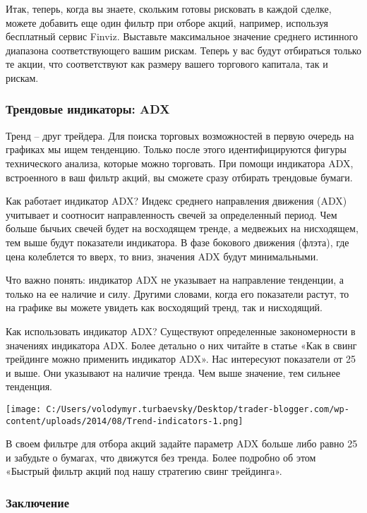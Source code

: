 \documentclass[a5paper]{article}
\begin{document}
Итак, теперь, когда вы знаете, скольким готовы рисковать в каждой
сделке, можете добавить еще один фильтр при отборе акций, например,
используя бесплатный сервис Finviz. Выставьте максимальное значение
среднего истинного диапазона соответствующего вашим рискам. Теперь у
вас будут отбираться только те акции, что соответствуют как размеру
вашего торгового капитала, так и рискам.

\subsubsection{Трендовые индикаторы: ADX}

Тренд – друг трейдера. Для поиска торговых возможностей в первую очередь на графиках мы ищем тенденцию. Только после этого идентифицируются фигуры технического анализа, которые можно торговать. При помощи индикатора ADX, встроенного в ваш фильтр акций, вы сможете сразу отбирать  трендовые бумаги.

Как работает индикатор ADX? Индекс среднего направления движения (ADX) учитывает и соотносит направленность свечей за определенный период. Чем больше бычьих свечей будет на восходящем тренде, а медвежьих на нисходящем, тем выше будут показатели индикатора. В фазе бокового движения (флэта), где цена колеблется то вверх, то вниз, значения ADX будут минимальными.

Что важно понять: индикатор ADX не указывает на направление тенденции, а только на ее наличие и силу. Другими словами, когда его показатели растут, то на графике вы можете увидеть как восходящий тренд, так и нисходящий.

Как использовать индикатор ADX? Существуют определенные закономерности
в значениях индикатора ADX. Более детально о них читайте в статье «Как
в свинг трейдинге можно применить индикатор ADX». Нас интересуют
показатели от 25 и выше. Они указывают на наличие тренда. Чем выше
значение, тем сильнее тенденция.

\texttt{[image: C:/Users/volodymyr.turbaevsky/Desktop/trader-blogger.com/wp-content/uploads/2014/08/Trend-indicators-1.png]}

В своем фильтре для отбора акций задайте параметр ADX больше либо равно 25 и забудьте
о бумагах, что движутся без тренда. Более подробно об этом «Быстрый
фильтр акций под нашу стратегию свинг трейдинга».

\subsubsection{Заключение}
\end{document}
